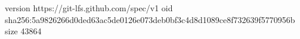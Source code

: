 version https://git-lfs.github.com/spec/v1
oid sha256:5a9826266d0ded63ac5de0126e073deb0bf3c4d8d1089ce8f732639f5770956b
size 43864

